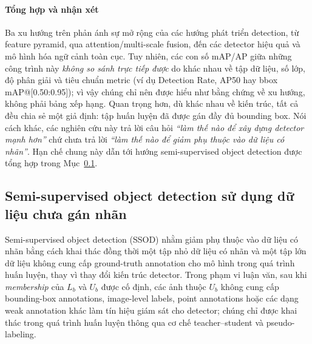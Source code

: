 \documentclass[pdflatex,sn-mathphys-num]{sn-jnl}%
\theoremstyle{thmstyleone}%
\theoremstyle{thmstyletwo}%
\theoremstyle{thmstylethree}%
\begin{document}
\paragraph{Tổng hợp và nhận xét}
Ba xu hướng trên phản ánh sự mở rộng của các hướng phát triển detection,
từ feature pyramid, qua attention/multi-scale fusion, đến các detector
hiệu quả và mô hình hóa ngữ cảnh toàn cục. Tuy nhiên,
các con số mAP/AP giữa những công trình này \emph{không so sánh trực tiếp được}
do khác nhau về tập dữ liệu, số lớp, độ phân giải và tiêu chuẩn metric (ví dụ
Detection Rate, AP50 hay bbox mAP@[0.50:0.95]); vì vậy chúng chỉ nên được hiểu như bằng
chứng về xu hướng, không phải bảng xếp hạng. Quan trọng hơn, dù khác nhau về kiến
trúc, tất cả đều chia sẻ một giả định: tập huấn luyện đã được gán đầy đủ bounding
box. Nói cách khác, các nghiên cứu này trả lời câu hỏi \textit{``làm thế nào để
xây dựng detector mạnh hơn''} chứ chưa trả lời \textit{``làm thế nào để giảm phụ
thuộc vào dữ liệu có nhãn''}. Hạn chế chung này dẫn tới hướng semi-supervised
object detection được tổng hợp trong Mục~\ref{sec:ssod}.
 
\subsection{Semi-supervised object detection sử dụng dữ liệu chưa gán nhãn}
\label{sec:ssod}
 
Semi-supervised object detection (SSOD) nhằm giảm phụ thuộc vào dữ liệu có nhãn
bằng cách khai thác đồng thời một tập nhỏ dữ liệu có nhãn và một tập lớn dữ liệu
không cung cấp ground-truth annotation cho mô hình trong quá trình huấn luyện,
thay vì thay đổi kiến trúc detector. Trong phạm vi luận văn, sau khi
\textit{membership} của \(L_b\) và \(U_b\) được cố định, các ảnh thuộc \(U_b\)
không cung cấp bounding-box annotations, image-level labels, point annotations
hoặc các dạng weak annotation khác làm tín hiệu giám sát cho detector; chúng chỉ
được khai thác trong quá trình huấn luyện thông qua cơ chế teacher--student và
pseudo-labeling.
 
\end{document}
